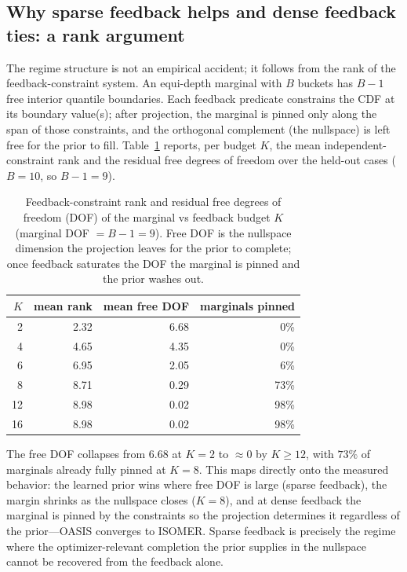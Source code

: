 \subsection{Why sparse feedback helps and dense feedback ties: a rank argument}
\label{sec:mr-mechanism}

The regime structure is not an empirical accident; it follows from the rank of
the feedback-constraint system. An equi-depth marginal with $B$ buckets has
$B{-}1$ free interior quantile boundaries. Each feedback predicate constrains the
CDF at its boundary value(s); after projection, the marginal is pinned only along
the span of those constraints, and the orthogonal complement (the nullspace) is
left free for the prior to fill. Table~\ref{tab:mr_rank} reports, per budget $K$,
the mean independent-constraint rank and the residual free degrees of freedom
over the held-out cases ($B{=}10$, so $B{-}1{=}9$).

\begin{table}[t]
  \centering\small
  \caption{Feedback-constraint rank and residual free degrees of freedom (DOF) of
  the marginal vs feedback budget $K$ (marginal DOF $=B{-}1=9$). Free DOF is the
  nullspace dimension the projection leaves for the prior to complete; once
  feedback saturates the DOF the marginal is pinned and the prior washes out.}
  \label{tab:mr_rank}
  \setlength{\tabcolsep}{8pt}
  \begin{tabular}{r rr r}
    \toprule
    $K$ & mean rank & mean free DOF & marginals pinned \\
    \midrule
    2  & 2.32 & 6.68 & 0\% \\
    4  & 4.65 & 4.35 & 0\% \\
    6  & 6.95 & 2.05 & 6\% \\
    8  & 8.71 & 0.29 & 73\% \\
    12 & 8.98 & 0.02 & 98\% \\
    16 & 8.98 & 0.02 & 98\% \\
    \bottomrule
  \end{tabular}
\end{table}

The free DOF collapses from $6.68$ at $K{=}2$ to $\approx 0$ by $K{\geq}12$, with
$73\%$ of marginals already fully pinned at $K{=}8$. This maps directly onto the
measured behavior: the learned prior wins where free DOF is large (sparse
feedback), the margin shrinks as the nullspace closes ($K{=}8$), and at dense
feedback the marginal is pinned by the constraints so the projection determines
it regardless of the prior---OASIS converges to ISOMER. Sparse feedback is
precisely the regime where the optimizer-relevant completion the prior supplies
in the nullspace cannot be recovered from the feedback alone.

